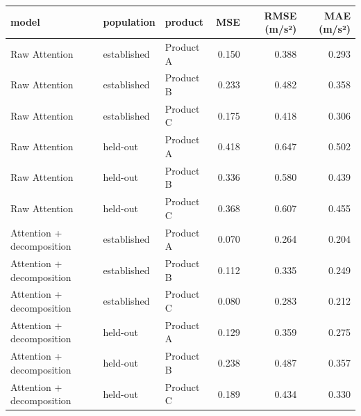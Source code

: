 \begin{tabular}{lllrrr}
\toprule
model & population & product & MSE & RMSE (m/s²) & MAE (m/s²) \\
\midrule
Raw Attention & established & Product A & 0.150 & 0.388 & 0.293 \\
Raw Attention & established & Product B & 0.233 & 0.482 & 0.358 \\
Raw Attention & established & Product C & 0.175 & 0.418 & 0.306 \\
Raw Attention & held-out & Product A & 0.418 & 0.647 & 0.502 \\
Raw Attention & held-out & Product B & 0.336 & 0.580 & 0.439 \\
Raw Attention & held-out & Product C & 0.368 & 0.607 & 0.455 \\
Attention + decomposition & established & Product A & 0.070 & 0.264 & 0.204 \\
Attention + decomposition & established & Product B & 0.112 & 0.335 & 0.249 \\
Attention + decomposition & established & Product C & 0.080 & 0.283 & 0.212 \\
Attention + decomposition & held-out & Product A & 0.129 & 0.359 & 0.275 \\
Attention + decomposition & held-out & Product B & 0.238 & 0.487 & 0.357 \\
Attention + decomposition & held-out & Product C & 0.189 & 0.434 & 0.330 \\
\bottomrule
\end{tabular}
